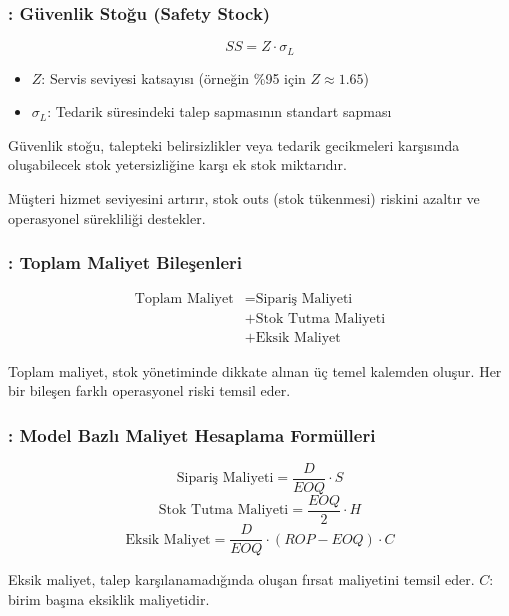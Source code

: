 \documentclass[12pt]{beamer}
\begin{document}
	\begin{frame}
		\frametitle{\insertsection: Güvenlik Stoğu (Safety Stock)}
		\begin{equation}
			SS = Z \cdot \sigma_L
		\end{equation}
		\begin{itemize}
			\item $Z$: Servis seviyesi katsayısı (örneğin \%95 için $Z
			\approx 1.65$)
			\item $\sigma_L$: Tedarik süresindeki talep sapmasının standart
			sapması
		\end{itemize}
		
		\begin{tcolorbox}
			Güvenlik stoğu, talepteki belirsizlikler veya tedarik
			gecikmeleri karşısında oluşabilecek stok yetersizliğine karşı ek stok
			miktarıdır.
		\end{tcolorbox}
		
		\begin{tcolorbox}
			Müşteri hizmet seviyesini artırır, stok outs (stok tükenmesi)
			riskini azaltır ve operasyonel sürekliliği destekler.
		\end{tcolorbox}
	\end{frame}
	
	\begin{frame}
		\frametitle{\insertsection: Toplam Maliyet Bileşenleri}
		\begin{align}
			\text{Toplam Maliyet} & = \text{Sipariş Maliyeti} \nonumber              \\
			& + \text{Stok Tutma Maliyeti} \nonumber           \\
			& + \text{Eksik Maliyet} \label{eq:toplam_maliyet}
		\end{align}
		
		\begin{tcolorbox}
			Toplam maliyet, stok yönetiminde dikkate alınan üç temel
			kalemden oluşur. Her bir bileşen farklı operasyonel riski temsil eder.
		\end{tcolorbox}
	\end{frame}
	
	\begin{frame}
		\frametitle{\insertsection: Model Bazlı Maliyet Hesaplama Formülleri}
		
		\begin{equation}
			\text{Sipariş Maliyeti} = \frac{D}{EOQ} \cdot S
		\end{equation}
		\begin{equation}
			\text{Stok Tutma Maliyeti} = \frac{EOQ}{2} \cdot H
		\end{equation}
		\begin{equation}
			\text{Eksik Maliyet} = \frac{D}{EOQ} \cdot (ROP - EOQ) \cdot C
		\end{equation}
		
		\begin{tcolorbox}
			Eksik maliyet, talep karşılanamadığında oluşan fırsat
			maliyetini temsil eder. $C$: birim başına eksiklik maliyetidir.
		\end{tcolorbox}
	\end{frame}
	
\end{document}
